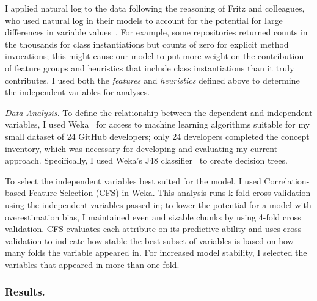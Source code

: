 \documentclass{llncs}
\begin{document}
I applied natural log to the data following the reasoning of Fritz and colleagues, who used natural log in their models to account for the potential for large differences in variable values~\cite{fritz2010degree}. For example, some repositories returned counts in the thousands for class instantiations but counts of zero for explicit method invocations; this might cause our model to put more weight on the contribution of feature groups and heuristics that include class instantiations than it truly contributes.
I used both the \emph{features} and \emph{heuristics} defined above to determine the independent variables for analyses.

\vspace{0.5em}
\noindent\textit{Data Analysis.}
To define the relationship between the dependent and independent variables, I used Weka~\cite{Hall:2009:WDM:1656274.1656278} for access to machine learning algorithms suitable for my small dataset of 24 GitHub developers; only 24 developers completed the concept inventory, which was necessary for developing and evaluating my current approach. 
Specifically, I used Weka's J48 classifier~\cite{witten1999weka} to create decision trees.

To select the independent variables best suited for the model, I used Correlation-based Feature Selection (CFS) in Weka. This analysis runs k-fold cross validation using the independent variables passed in; to lower the potential for a model with overestimation bias, I maintained even and sizable chunks by using 4-fold cross validation.
CFS evaluates each attribute on its predictive ability and uses cross-validation to indicate how stable the best subset of variables is based on how many folds the variable appeared in.
For increased model stability, I selected the variables that appeared in more than one fold.

\subsubsection{Results.}
\end{document}
